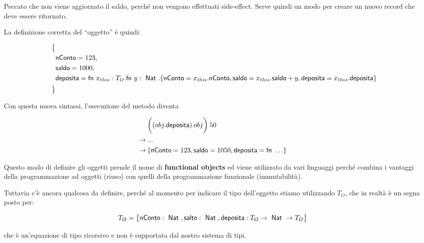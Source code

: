 \noindent Peccato che non viene aggiornato il saldo, perché non vengono effettuati side-effect.
Serve quindi un modo per creare un nuovo record che deve essere ritornato.

La definizione corretta del ``oggetto'' è quindi:

\begin{align*}
\big\{& \\
\quad & \text{nConto} = 123,  \\
\quad &\text{saldo} = 1000, \\
\quad &\text{deposita} = \fn x_{this} : T_O . \fn y : \Nat. \{ \text{nConto} = x_{this}.\text{nConto}, \text{saldo} = x_{this}.\text{saldo} + y, \text{deposita} = x_{this}.\text{deposita}\}  \\
\big\}&
\end{align*}

\noindent Con questa nuova sintassi, l'esecuzione del metodo diventa

\begin{align*}
\quad &\bigg( (obj.\text{deposita}) \: obj \bigg) \: 50  \\
\rightarrow\: & ... \\
\rightarrow\: & \{ \text{nConto} = 123, \text{saldo} = 1050, \text{deposita} = \fn \ldots \} 
\end{align*}

\noindent Questo modo di definire gli oggetti prende il nome di \textbf{functional objects} ed viene utilizzato da vari linguaggi perché combina i vantaggi della programmazione ad oggetti (riuso) con quelli della programmazione funzionale (immutabilità).

Tuttavia c'è ancora qualcosa da definire, perché al momento per indicare il tipo dell'oggetto stiamo utilizzando $T_O$, che in realtà è un segna posto per:

$$
T_O = \big\{ \text{nConto}: \Nat, \text{salto} : \Nat, \text{deposita}: T_O \rightarrow \Nat \rightarrow T_O \big\}
$$

\noindent che è un'equazione di tipo ricorsivo e non è supportata dal nostro sistema di tipi.
















